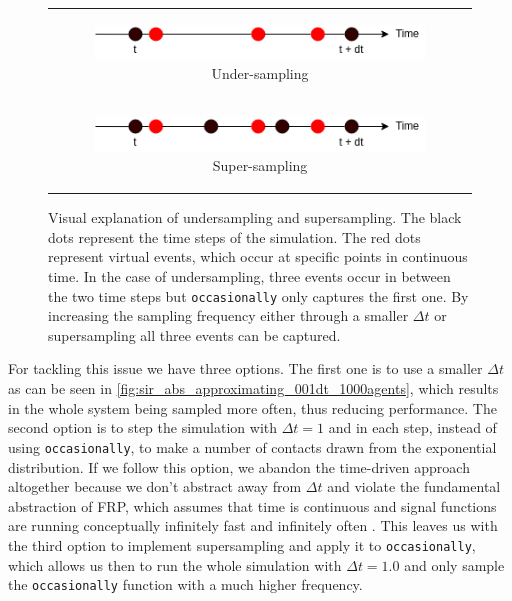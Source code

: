 \begin{figure}
\begin{center}
	\begin{tabular}{c}
		\begin{subfigure}[b]{0.5\textwidth}
			\centering
			\includegraphics[width=1\textwidth, angle=0]{./fig/timedriven/undersampling.png}
			\caption{Under-sampling}
			\label{fig:undersampling}
		\end{subfigure}
		
		\\
		
		\begin{subfigure}[b]{0.5\textwidth}
			\centering
			\includegraphics[width=1\textwidth, angle=0]{./fig/timedriven/supersampling.png}
			\caption{Super-sampling}
			\label{fig:supersampling}
		\end{subfigure}
	\end{tabular}
	
	\caption[Visual explanation of undersampling and supersampling]{Visual explanation of undersampling and supersampling. The black dots represent the time steps of the simulation. The red dots represent virtual events, which occur at specific points in continuous time. In the case of undersampling, three events occur in between the two time steps but \texttt{occasionally} only captures the first one. By increasing the sampling frequency either through a smaller $\Delta t$ or supersampling all three events can be captured.} 
	\label{fig:sampling_issue}
\end{center}
\end{figure}

For tackling this issue we have three options. The first one is to use a smaller $\Delta t$ as can be seen in \ref{fig:sir_abs_approximating_001dt_1000agents}, which results in the whole system being sampled more often, thus reducing performance. The second option is to step the simulation with $\Delta t = 1$ and in each step, instead of using \texttt{occasionally}, to make a number of contacts drawn from the exponential distribution. If we follow this option, we abandon the time-driven approach altogether because we don't abstract away from $\Delta t$ and violate the fundamental abstraction of FRP, which assumes that time is continuous and signal functions are running conceptually infinitely fast and infinitely often \cite{winograd-cort_wormholes:_2012}. This leaves us with the third option to implement supersampling and apply it to \texttt{occasionally}, which allows us then to run the whole simulation with $\Delta t = 1.0$ and only sample the \texttt{occasionally} function with a much higher frequency.

